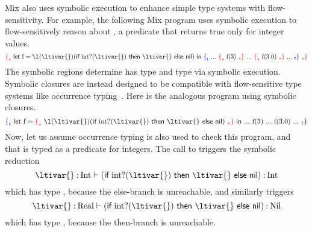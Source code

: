 \documentclass[11pt,final]{iuthesis}
\begin{document}
Mix also uses symbolic execution to enhance simple type systems with flow-sensitivity.
For example, the following Mix program uses symbolic execution 
to flow-sensitively reason about , a predicate that returns true only for integer values.
%
\[
\MixSregion{\ltilet{\text{f}}{\ltiufun{\ltivar{}}{(\ltiif{\ltiapp{\text{int?}}{\ltivar{}}}{\ltivar{}}{\textsf{nil}})}}
                  {\MixTregion{  ...\ \MixSregion{\ltiapp{\text{f}}{3}}
                               \ ...\ \MixSregion{\ltiapp{\text{f}}{3.0}}
                               \ ... }}}
\]
%
The symbolic regions determine
 has type  and
 type  via symbolic execution.
Symbolic closures are instead designed to be compatible with flow-sensitive type systems like occurrence typing~\cite{TF10}.
Here is the analogous program using symbolic closures.
%
\[
\MixTregion{\ltilet{\text{f}}{\MixSregion{\ltiufun{\ltivar{}}{(\ltiif{\ltiapp{\text{int?}}{\ltivar{}}}{\ltivar{}}{\textsf{nil}})}}}
                  {  ...\ {\ltiapp{\text{f}}{3}}
                               \ ...\ {\ltiapp{\text{f}}{3.0}}
                               \ ... }}
\]
%
Now, let us assume occurrence typing is also used to check this program, and
that  is typed as a predicate for integers.
The call to
{}
triggers the symbolic reduction
%
\[
\ltitjudgementNoElab{\hastype{\ltivar{}}{\text{Int}}}
                    {(\ltiif{\ltiapp{\text{int?}}{\ltivar{}}}{\ltivar{}}{\textsf{nil}})}
                    {\text{Int}}
\]
%
which has type , because the else-branch is unreachable, and 
similarly {} triggers
%
\[
\ltitjudgementNoElab{\hastype{\ltivar{}}{\text{Real}}}
                    {(\ltiif{\ltiapp{\text{int?}}{\ltivar{}}}{\ltivar{}}{\textsf{nil}})}
                    {\text{Nil}}
\]
%
which has type , because the then-branch is unreachable.




\end{document}
